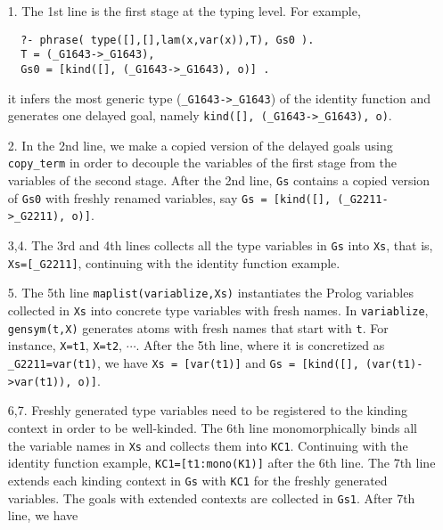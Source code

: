 \documentclass[runningheads,a4paper]{llncs}
\begin{document}
\begin{itemize}
\item[1.]
The 1st line is the first stage at the typing level.
For example, {\small \vspace*{-1.1ex}
\begin{verbatim}
  ?- phrase( type([],[],lam(x,var(x)),T), Gs0 ).
  T = (_G1643->_G1643),
  Gs0 = [kind([], (_G1643->_G1643), o)] .
\end{verbatim} \vspace*{-1.1ex} }
it infers the most generic type ({\small\verb|_G1643->_G1643|})
of the identity function and generates one delayed goal, namely
{\;\small\verb|kind([], (_G1643->_G1643), o)|}.
\item[2.]
In the 2nd line, we make a copied version of
the delayed goals using {\small\verb|copy_term|} in order to decouple
the variables of the first stage from the variables of the second stage.
After the 2nd line, {\small\verb|Gs|} contains a copied version of
{\small\verb|Gs0|} with freshly renamed variables, say
{\small\verb|Gs = [kind([], (_G2211->_G2211), o)]|}.
\item[3,4.]
The 3rd and 4th lines collects all the type variables
in {\small\verb|Gs|} into {\small\verb|Xs|}, that is,
{\small\verb|Xs=[_G2211]|}, continuing with the identity function example.
\item[5.]
The 5th line {\small\verb|maplist(variablize,Xs)|} instantiates
the Prolog variables collected in {\small\verb|Xs|} into concrete
type variables with fresh names. In {\small\verb|variablize|},
{\small\verb|gensym(t,X)|} generates atoms with fresh names that start with
{\small\verb|t|}. For instance, {\small\verb|X=t1|}, {\small\verb|X=t2|},
$\cdots$. After the 5th line, where it is concretized as
{\small\verb|_G2211=var(t1)|}, we have {\small\verb|Xs = [var(t1)]|} and
{\small\verb|Gs = [kind([], (var(t1)->var(t1)), o)]|}.
\item[6,7.] Freshly generated type variables need to be
registered to the kinding context in order to be well-kinded.
The 6th line monomorphically binds 
all the variable names in {\small\verb|Xs|} and collects them
into {\small\verb|KC1|}. Continuing with the identity function example,
{\small\verb|KC1=[t1:mono(K1)]|} after the 6th line. The 7th line
extends each kinding context in {\small\verb|Gs|} with {\small\verb|KC1|}
for the freshly generated variables. The goals with extended contexts are
collected in {\small\verb|Gs1|}. After 7th line, we have 

\end{itemize}
\end{document}
